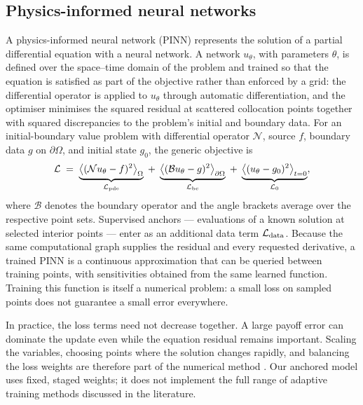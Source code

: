 \documentclass[11pt,a4paper]{article}
\begin{document}
\subsection{Physics-informed neural networks}
\label{sec:pinn-general}

A physics-informed neural network (PINN) \cite{raissi2019} represents the solution of a partial differential equation with a neural network. A network $u_\theta$, with parameters $\theta$, is defined over the space--time domain of the problem and trained so that the equation is satisfied as part of the objective rather than enforced by a grid: the differential operator is applied to $u_\theta$ through automatic differentiation, and the optimiser minimises the squared residual at scattered collocation points together with squared discrepancies to the problem's initial and boundary data. For an initial-boundary value problem with differential operator $\mathcal N$, source $f$, boundary data $g$ on $\partial\Omega$, and initial state $g_0$, the generic objective is
\begin{equation}
\mathcal L \;=\;
\underbrace{\bigl\langle(\mathcal N u_\theta-f)^2\bigr\rangle_{\Omega}}_{\mathcal L_{\rm pde}}
\;+\;
\underbrace{\bigl\langle(\mathcal B u_\theta-g)^2\bigr\rangle_{\partial\Omega}}_{\mathcal L_{\rm bc}}
\;+\;
\underbrace{\bigl\langle(u_\theta-g_0)^2\bigr\rangle_{t=0}}_{\mathcal L_{0}},
\label{eq:generic-pinn}
\end{equation}
where $\mathcal B$ denotes the boundary operator and the angle brackets average over the respective point sets. Supervised anchors --- evaluations of a known solution at selected interior points --- enter as an additional data term $\mathcal L_{\rm data}$. Because the same computational graph supplies the residual and every requested derivative, a trained PINN is a continuous approximation that can be queried between training points, with sensitivities obtained from the same learned function. Training this function is itself a numerical problem: a small loss on sampled points does not guarantee a small error everywhere.

In practice, the loss terms need not decrease together. A large payoff error can dominate the update even while the equation residual remains important. Scaling the variables, choosing points where the solution changes rapidly, and balancing the loss weights are therefore part of the numerical method \cite{expert2023,wang2021path}. Our anchored model uses fixed, staged weights; it does not implement the full range of adaptive training methods discussed in the literature.
\end{document}

